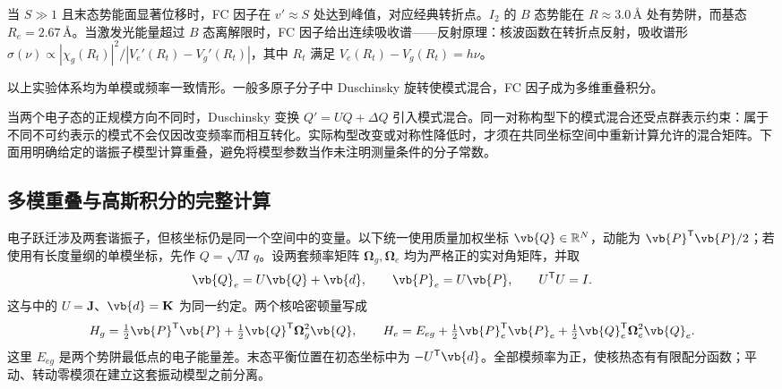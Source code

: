 当 \(S\gg1\) 且末态势能面显著位移时，FC 因子在 \(v'\approx S\) 处达到峰值，对应经典转折点。\(I_2\) 的 \(B\) 态势能在 \(R\approx3.0\,\text{\AA}\) 处有势阱，而基态 \(R_e=2.67\,\text{\AA}\)。当激发光能量超过 \(B\) 态离解限时，FC 因子给出连续吸收谱——反射原理：核波函数在转折点反射，吸收谱形 \(\sigma(\nu)\propto|\chi_g(R_t)|^2/|V_e'(R_t)-V_g'(R_t)|\)，其中 \(R_t\) 满足 \(V_e(R_t)-V_g(R_t)=h\nu\)。


以上实验体系均为单模或频率一致情形。一般多原子分子中 Duschinsky 旋转使模式混合，FC 因子成为多维重叠积分。

当两个电子态的正规模方向不同时，Duschinsky 变换 \(Q'=UQ+\Delta Q\) 引入模式混合。同一对称构型下的模式混合还受点群表示约束：属于不同不可约表示的模式不会仅因改变频率而相互转化。实际构型改变或对称性降低时，才须在共同坐标空间中重新计算允许的混合矩阵。下面用明确给定的谐振子模型计算重叠，避免将模型参数当作未注明测量条件的分子常数。

\subsection{多模重叠与高斯积分的完整计算}

电子跃迁涉及两套谐振子，但核坐标仍是同一个空间中的变量。以下统一使用质量加权坐标 $\vb{Q}\in\mathbb R^N$，动能为 $\vb{P}^{\mathsf T}\vb{P}/2$；若使用有长度量纲的单模坐标，先作 $Q=\sqrt M\,q$。设两套频率矩阵 $\boldsymbol\Omega_g,\boldsymbol\Omega_e$ 均为严格正的实对角矩阵，并取
\begin{equation}
 \vb{Q}_e=U\vb{Q}+\vb{d},\qquad
 \vb{P}_e=U\vb{P},\qquad U^{\mathsf T}U=I.
 \label{eq:duschinsky-general}
\end{equation}
这与中的 $U=\mathbf J$、$\vb{d}=\mathbf K$ 为同一约定。两个核哈密顿量写成
\[
 H_g=\tfrac12\vb{P}^{\mathsf T}\vb{P}
       +\tfrac12\vb{Q}^{\mathsf T}\boldsymbol\Omega_g^2\vb{Q},
 \qquad
 H_e=E_{eg}+\tfrac12\vb{P}_e^{\mathsf T}\vb{P}_e
       +\tfrac12\vb{Q}_e^{\mathsf T}\boldsymbol\Omega_e^2\vb{Q}_e.
\]
这里 $E_{eg}$ 是两个势阱最低点的电子能量差。末态平衡位置在初态坐标中为 $-U^{\mathsf T}\vb{d}$。全部模频率为正，使核热态有有限配分函数；平动、转动零模须在建立这套振动模型之前分离。

